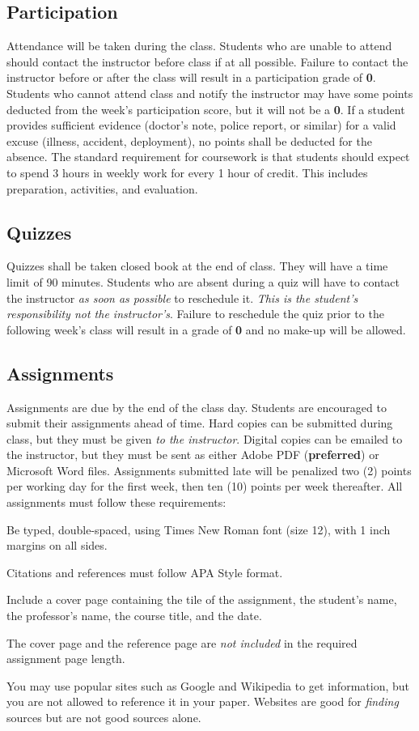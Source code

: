 \subsection*{Participation}
Attendance will be taken during the class. Students who are unable to attend should contact the instructor before class if at all possible. Failure to contact the instructor before or after the class will result in a participation grade of \textbf{0}. Students who cannot attend class and notify the instructor may have some points deducted from the week's participation score, but it will not be a \textbf{0}. If a student provides sufficient evidence (doctor's note, police report, or similar) for a valid excuse (illness, accident, deployment), no points shall be deducted for the absence. The standard requirement for coursework is that students should expect to spend 3 hours in weekly work for every 1 hour of credit. This includes preparation, activities, and evaluation.

\subsection*{Quizzes}
Quizzes shall be taken closed book at the end of class. They will have a time limit of 90 minutes. Students who are absent during a quiz will have to contact the instructor \emph{as soon as possible} to reschedule it. \emph{This is the student's responsibility not the instructor's}. Failure to reschedule the quiz prior to the following week's class will result in a grade of \textbf{0} and no make-up will be allowed.

\subsection*{Assignments}
Assignments are due by the end of the class day. Students are encouraged to submit their assignments ahead of time. Hard copies can be submitted during class, but they must be given \emph{to the instructor}. Digital copies can be emailed to the instructor, but they must be sent as either Adobe PDF (\textbf{preferred}) or Microsoft Word files. Assignments submitted late will be penalized two (2) points per working day for the first week, then ten (10) points per week thereafter. All assignments must follow these requirements:
\begin{itemize*}
	\item Be typed, double-spaced, using Times New Roman font (size 12), with 1 inch margins on all sides.
	\item Citations and references must follow APA Style format.
	\item Include a cover page containing the tile of the assignment, the student's name, the professor's name, the course title, and the date.
	\item The cover page and the reference page are \emph{not included} in the required assignment page length.
	\item You may use popular sites such as Google and Wikipedia to get information, but you are not allowed to reference it in your paper. Websites are good for \emph{finding} sources but are not good sources alone.
\end{itemize*}
